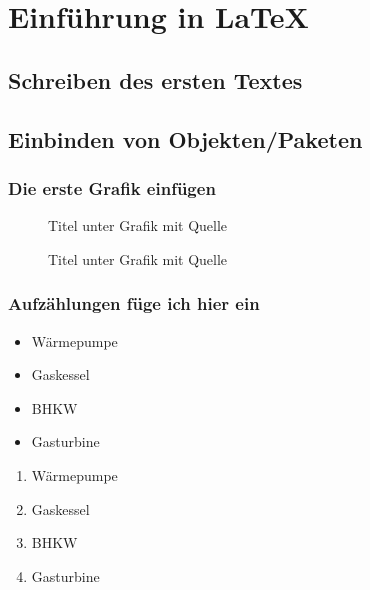 
\chapter{Einführung in LaTeX}
	\label{chap:einfuehrung}
	
	
\section{Schreiben des ersten Textes}
	\label{sec:erster_text}
	
	
\section{Einbinden von Objekten/Paketen}
	\label{sec:objekte}

	
\subsection{Die erste Grafik einfügen}
	\label{sec:grafik}
\begin{figure}[H]
	\centering
	\caption[Titel fürs Inhaltsverzeichnis]{Titel unter Grafik mit Quelle}
	\cite{agfw_leitfaden_wp}
	\label{fig:grafik_jpg}
\end{figure}

\begin{figure}[H]
	\centering
	\caption[Titel fürs Inhaltsverzeichnis]{Titel unter Grafik mit Quelle}
	\cite{agfw_leitfaden_wp}
	\label{fig:grafik_pdf}
\end{figure}
	
\subsection{Aufzählungen füge ich hier ein}
	\label{sec:aufzaehlung}

\begin{itemize}[noitemsep, label=+]
	\item Wärmepumpe
	\item Gaskessel 
	\item BHKW
	\item Gasturbine
\end{itemize}

\begin{enumerate}[noitemsep, label=\alph*]
	\item Wärmepumpe
	\item Gaskessel 
	\item BHKW
	\item Gasturbine
\end{enumerate}
	
